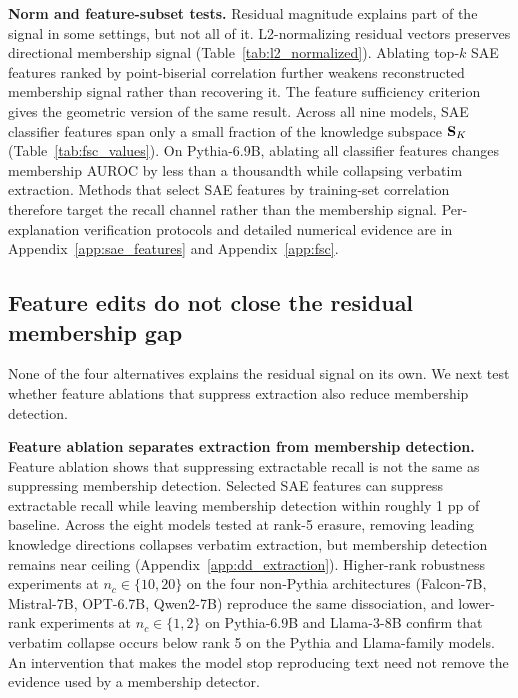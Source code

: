 \textbf{Norm and feature-subset tests.}
Residual magnitude explains part of the signal in some settings, but not all of it. L2-normalizing residual vectors preserves directional membership signal (Table~\ref{tab:l2_normalized}). Ablating top-$k$ SAE features ranked by point-biserial correlation further weakens reconstructed membership signal rather than recovering it. The feature sufficiency criterion gives the geometric version of the same result. Across all nine models, SAE classifier features span only a small fraction of the knowledge subspace $\mathbf{S}_K$ (Table~\ref{tab:fsc_values}). On Pythia-6.9B, ablating all classifier features changes membership AUROC by less than a thousandth while collapsing verbatim extraction. Methods that select SAE features by training-set correlation~\citep{wang2025sspu,frikha2025privacyscalpel,muhamed2025dsg} therefore target the recall channel rather than the membership signal. Per-explanation verification protocols and detailed numerical evidence are in Appendix~\ref{app:sae_features} and Appendix~\ref{app:fsc}.

\subsection{Feature edits do not close the residual membership gap}
\label{sec:results:interventions}

None of the four alternatives explains the residual signal on its own. We next test whether feature ablations that suppress extraction also reduce membership detection.

\textbf{Feature ablation separates extraction from membership detection.}
Feature ablation shows that suppressing extractable recall is not the same as suppressing membership detection. Selected SAE features can suppress extractable recall while leaving membership detection within roughly 1 pp of baseline. Across the eight models tested at rank-5 erasure, removing leading knowledge directions collapses verbatim extraction, but membership detection remains near ceiling (Appendix~\ref{app:dd_extraction}). Higher-rank robustness experiments at $n_c \in \{10, 20\}$ on the four non-Pythia architectures (Falcon-7B, Mistral-7B, OPT-6.7B, Qwen2-7B) reproduce the same dissociation, and lower-rank experiments at $n_c \in \{1, 2\}$ on Pythia-6.9B and Llama-3-8B confirm that verbatim collapse occurs below rank 5 on the Pythia and Llama-family models. An intervention that makes the model stop reproducing text need not remove the evidence used by a membership detector.

